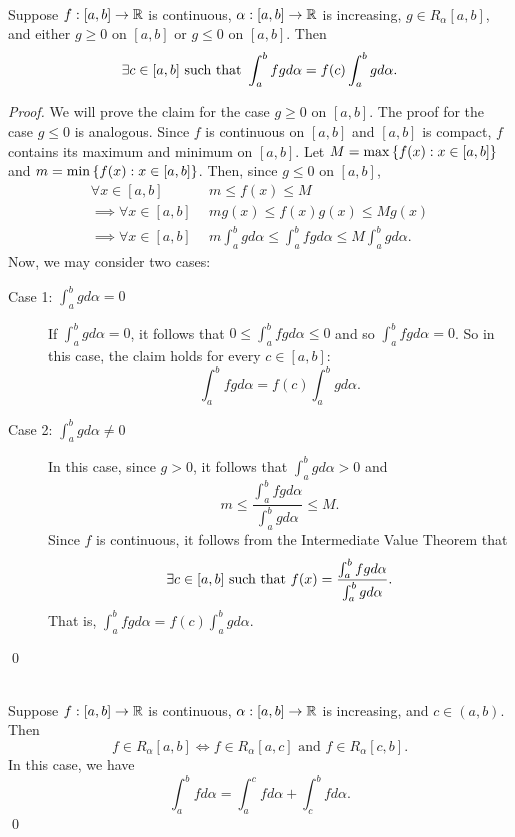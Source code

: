 \begin{theorem} \leavevmode \\
    \label{Thm6.15}
    Suppose $f:[a,b] \to \mathbb{R}$ is continuous, $\alpha: [a,b] \to \mathbb{R}$ is increasing, $g \in R_\alpha[a,b]$, and either $g \geq 0$ on $[a,b]$ or $g \leq 0$ on $[a,b]$. Then
    $$\exists c \in [a,b] \text{ such that } \int_a^bfg d\alpha = f(c) \int_a^bgd \alpha.$$
\end{theorem}

\begin{proof}
    We will prove the claim for the case $g \geq 0$ on $[a,b]$. The proof for the case $g \leq 0$ is analogous. Since $f$ is continuous on $[a,b]$ and $[a,b]$ is compact, $f$ contains its maximum and minimum on $[a,b]$. Let $M = \max\left\{f(x) : x \in [a,b]\right\}$ and $m = \min \left\{f(x) : x \in [a,b]\right\}$. Then, since $g \leq 0$ on $[a,b]$,
    \begin{align*}
        \forall x \in [a,b] &~~m \leq f(x) \leq M \\
        \implies \forall x \in [a,b] &~~mg(x) \leq f(x)g(x) \leq Mg(x) \\
        \implies \forall x \in [a,b] &~~m \int_a^b gd\alpha \leq \int_a^b fg d\alpha \leq M \int_a^bg d\alpha.
    \end{align*}
    Now, we may consider two cases:
    \begin{description}
        \item[Case 1: $\int_a^bgd\alpha = 0$]
        If $\int_a^bgd\alpha = 0$, it follows that $0 \leq \int_a^b fgd\alpha \leq 0$ and so $\int_a^bfgd \alpha = 0$. So in this case, the claim holds for every $c \in [a,b]$:
        $$\int_a^b fgd\alpha = f(c) \int_a^b gd\alpha.$$

        \item[Case 2: $\int_a^bg d\alpha \neq 0$]
        In this case, since $g > 0$, it follows that $\int_a^bgd\alpha > 0$ and
        $$m \leq \dfrac{\int_a^bfg d\alpha}{\int_a^b g d\alpha} \leq M.$$
        Since $f$ is continuous, it follows from the Intermediate Value Theorem that
        $$\exists c \in [a,b] \text{ such that } f(x) = \dfrac{\int_a^b fg d\alpha}{\int_a^b gd\alpha}.$$
        That is, $\int_a^b fgd\alpha = f(c) \int_a^b g d\alpha$.
    \end{description}
    \qed
\end{proof}

\begin{theorem} \leavevmode \\
  \label{Thm6.16}
    Suppose $f:[a,b] \to \mathbb{R}$ is continuous, $\alpha:[a,b] \to \mathbb{R}$ is increasing, and $c \in (a,b)$. Then
    $$f \in R_\alpha[a,b] \iff f\in R_\alpha[a,c] \text{ and } f \in R_\alpha[c,b].$$
    In this case, we have
    $$\int_a^b f d\alpha = \int_a^c f d\alpha + \int_c^b f d\alpha.$$
    \qed
\end{theorem}